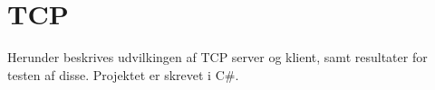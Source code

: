 \chapter{TCP}
Herunder beskrives udvilkingen af TCP server og klient, samt resultater for testen af disse. Projektet er skrevet i C#.


